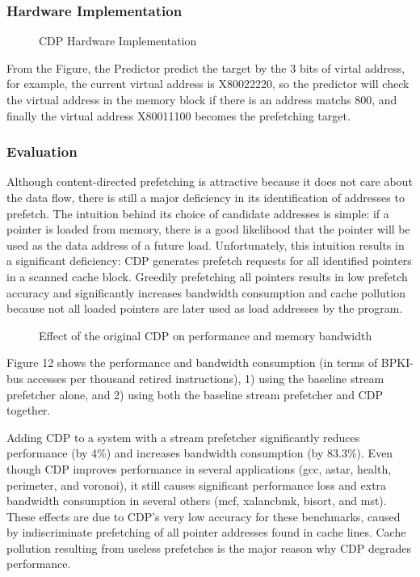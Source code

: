 \documentclass{acm_proc_article-sp}
\begin{document}
\subsubsection{Hardware Implementation}

\begin{figure}
\centering
{}
\caption{CDP Hardware Implementation}
\end{figure}
From the Figure, the Predictor predict the target by the 3 bits of
virtal address, for example, the current virtual address is X80022220,
so the predictor will check the virtual address in the memory block if
there is an address matchs 800, and finally the virtual address
X80011100 becomes the prefetching target.

\subsubsection{Evaluation}
Although content-directed prefetching is attractive because it does
not care about the data flow, there is still a major deficiency in
its identification of addresses to 
prefetch. The intuition behind its choice
of candidate addresses is simple: if a pointer is loaded from memory,
there is a good likelihood that the pointer will be used as the data 
address of a future load. Unfortunately, this intuition results in a
significant deficiency: CDP generates prefetch requests for all
identified pointers in a scanned cache block. Greedily prefetching all
pointers results in low prefetch accuracy and significantly increases
bandwidth consumption and cache pollution  because not all loaded
pointers are later used as load addresses by the program. 
\begin{figure}
\centering
{}
\caption{Effect of the original CDP on performance and memory
  bandwidth\cite{4798232}} 
\end{figure}

Figure 12 shows the performance and bandwidth consumption (in terms
of BPKI-bus accesses per thousand retired instructions), 1) using
the baseline stream prefetcher alone, and 2) using both the baseline
stream prefetcher and CDP together.

 Adding CDP to a system with a stream prefetcher significantly reduces
 performance (by 4\%) and increases bandwidth consumption (by
 83.3\%). Even though 
CDP improves performance in several applications (gcc, astar,
health, perimeter, and voronoi), it still causes significant
performance loss and extra bandwidth consumption in several others
(mcf, xalancbmk, bisort, and mst). These effects are due to CDP’s
very low accuracy for these benchmarks, caused by indiscriminate
prefetching of all pointer addresses found in cache 
lines. Cache pollution resulting from useless prefetches is the major
reason why CDP degrades performance. 
\end{document}
